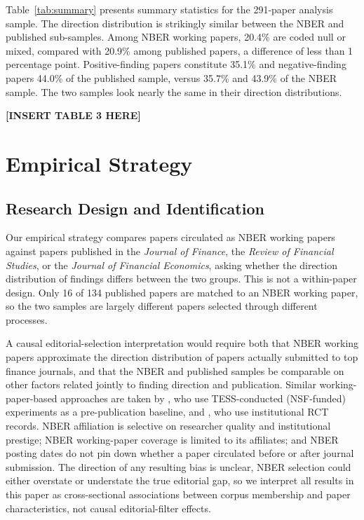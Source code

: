 \documentclass[12pt]{article}
\newcommand{\JF}{\textit{Journal of Finance}}
\newcommand{\RFS}{\textit{Review of Financial Studies}}
\newcommand{\JFE}{\textit{Journal of Financial Economics}}
\begin{document}
Table~\ref{tab:summary} presents summary statistics for the 291-paper analysis
sample.  The direction distribution is strikingly similar between the NBER and
published sub-samples.  Among NBER working papers, 20.4\% are coded null or
mixed, compared with 20.9\% among published papers, a difference of less than
1 percentage point.  Positive-finding papers constitute 35.1\% and
negative-finding papers 44.0\% of the published sample, versus 35.7\% and
43.9\% of the NBER sample.  The two samples look nearly the same in their direction distributions.


\begin{center}
\textbf{[INSERT TABLE 3 HERE]}
\end{center}

\section{Empirical Strategy}
\label{sec:methods}

\subsection{Research Design and Identification}
\label{subsec:design}

Our empirical strategy compares papers circulated as NBER working papers
against papers published in the \JF{}, the \RFS{}, or the \JFE{}, asking
whether the direction distribution of findings differs between the two groups.
This is not a within-paper design.  Only 16 of 134 published papers are matched
to an NBER working paper, so the two samples are largely different papers
selected through different processes.

A causal editorial-selection interpretation would require both that NBER
working papers approximate the direction distribution of papers actually
submitted to top finance journals, and that the NBER and published
samples be comparable on other factors related jointly to finding
direction and publication.  Similar working-paper-based approaches are
taken by \citet*{Franco2014}, who use TESS-conducted (NSF-funded)
experiments as a pre-publication baseline, and \citet*{DellaVigna2022},
who use institutional RCT records.  NBER
affiliation is selective on researcher quality and institutional
prestige; NBER working-paper coverage is limited to its affiliates;
and NBER posting dates do not pin down whether a paper circulated
before or after journal submission.  The direction of any resulting bias is
unclear, NBER selection could either overstate or understate the true
editorial gap, so we interpret all results in this paper as
cross-sectional associations between corpus membership and paper
characteristics, not causal editorial-filter effects.
\end{document}
